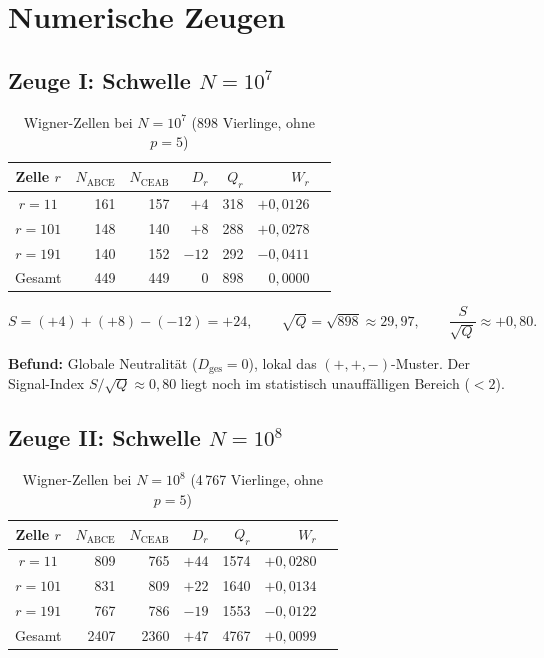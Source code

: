 \documentclass[12pt, a4paper]{article}
\begin{document}
\section{Numerische Zeugen}

\subsection{Zeuge I: Schwelle $N = 10^7$}

\begin{table}[h]
\centering
\caption{Wigner-Zellen bei $N = 10^7$ (898 Vierlinge, ohne $p=5$)}
\label{tab:N7}
\begin{tabular}{crrrrrr}
\toprule
Zelle $r$ & $N_{\text{ABCE}}$ & $N_{\text{CEAB}}$ & $D_r$ & $Q_r$ & $W_r$ \\
\midrule
$r = 11$  & 161 & 157 & $+4$  & 318 & $+0{,}0126$ \\
$r = 101$ & 148 & 140 & $+8$  & 288 & $+0{,}0278$ \\
$r = 191$ & 140 & 152 & $-12$ & 292 & $-0{,}0411$ \\
\midrule
Gesamt    & 449 & 449 & $0$   & 898 & $0{,}0000$ \\
\bottomrule
\end{tabular}
\end{table}

\[
S = (+4) + (+8) - (-12) = +24, \qquad
\sqrt{Q} = \sqrt{898} \approx 29{,}97, \qquad
\frac{S}{\sqrt{Q}} \approx +0{,}80.
\]

\noindent\textbf{Befund:} Globale Neutralität ($D_{\text{ges}} = 0$), lokal das
$(+,+,-)$-Muster. Der Signal-Index $S/\sqrt{Q} \approx 0{,}80$ liegt noch im
statistisch unauffälligen Bereich ($< 2$).

\subsection{Zeuge II: Schwelle $N = 10^8$}

\begin{table}[h]
\centering
\caption{Wigner-Zellen bei $N = 10^8$ (4\,767 Vierlinge, ohne $p=5$)}
\label{tab:N8}
\begin{tabular}{crrrrrr}
\toprule
Zelle $r$ & $N_{\text{ABCE}}$ & $N_{\text{CEAB}}$ & $D_r$ & $Q_r$ & $W_r$ \\
\midrule
$r = 11$  & 809 & 765 & $+44$ & 1574 & $+0{,}0280$ \\
$r = 101$ & 831 & 809 & $+22$ & 1640 & $+0{,}0134$ \\
$r = 191$ & 767 & 786 & $-19$ & 1553 & $-0{,}0122$ \\
\midrule
Gesamt    & 2407 & 2360 & $+47$ & 4767 & $+0{,}0099$ \\
\bottomrule
\end{tabular}
\end{table}
\end{document}
